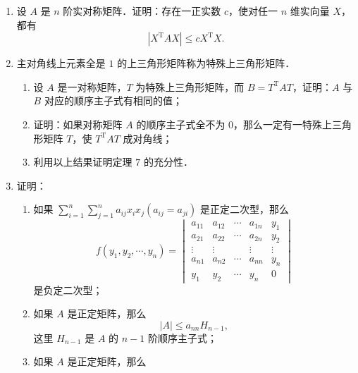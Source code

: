 \begin{enumerate}
  \[
    \begin{pmatrix}
      0&1&&&&&&&&\\
      -1&0&&&&&&&&\\
      &&0&1&&&&&&\\
      &&-1&0&&&&&&\\
      &&&&\ddots&&&&&\\
      &&&&&0&1&&&\\
      &&&&&-1&0&&&\\
      &&&&&&&0&&\\
      &&&&&&&&\ddots&\\
      &&&&&&&&&0
    \end{pmatrix}
  \]
  \ansproof
  \item 设 $A$ 是 $n$ 阶实对称矩阵．证明：存在一正实数 $c$，使对任一 $n$ 维实向量 $X$，都有
  \[
    |X^{\mathrm{T}}AX|\leqslant cX^{\mathrm{T}}X.
  \]
  \ansproof
  \item 主对角线上元素全是 $1$ 的上三角形矩阵称为特殊上三角形矩阵．
  \begin{enumerate}
    \item 设 $A$ 是一对称矩阵，$T$ 为特殊上三角形矩阵，而 $B=T^{\mathrm{T}}AT$，证明：$A$ 与 $B$ 对应的顺序主子式有相同的值；
  \anssub
    \item 证明：如果对称矩阵 $A$ 的顺序主子式全不为 $0$，那么一定有一特殊上三角形矩阵 $T$，使 $T^{\mathrm{T}}AT$ 成对角线；
  \anssub
    \item 利用以上结果证明定理 $7$ 的充分性．
  \anssub
  \end{enumerate}
  \item 证明：
  \begin{enumerate}
    \item 如果 $\sum\limits_{i=1}^{n}\sum\limits_{j=1}^{n}a_{ij}x_ix_j(a_{ij}=a_{ji})$ 是正定二次型，那么
    \[
      f(y_1,y_2,\cdots,y_n)=
      \begin{vmatrix}
        a_{11}&a_{12}&\cdots&a_{1n}&y_1\\
        a_{21}&a_{22}&\cdots&a_{2n}&y_2\\
        \vdots&\vdots&&\vdots&\vdots\\
        a_{n1}&a_{n2}&\cdots&a_{nn}&y_n\\
        y_1&y_2&\cdots&y_n&0
      \end{vmatrix}
    \]
    是负定二次型；
  \anssub
    \item 如果 $A$ 是正定矩阵，那么
    \[
      |A|\leqslant a_{nn}H_{n-1},
    \]
    这里 $H_{n-1}$ 是 $A$ 的 $n-1$ 阶顺序主子式；
  \anssub
    \item 如果 $A$ 是正定矩阵，那么

\end{enumerate}
\end{enumerate}

